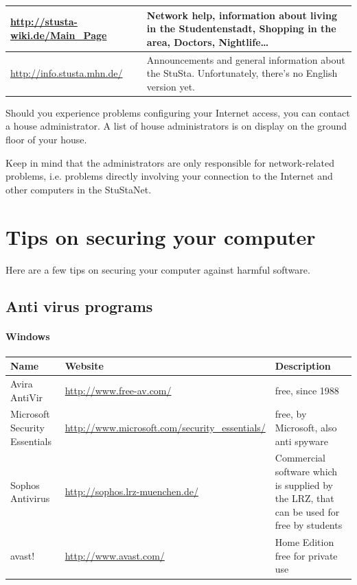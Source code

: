 \documentclass[a4paper,12pt]{scrartcl}
\begin{document}
\begin{center}
  \begin{tabularx}{\linewidth}{|lX|}
    \hline
    \url{http://stusta-wiki.de/Main_Page} & Network help, information about living in the Studentenstadt, Shopping in the area, Doctors, Nightlife\dots\\
    \hline
    \url{http://info.stusta.mhn.de/} & Announcements and general information about the StuSta. Unfortunately, there's no English version yet.\\
    \hline
  \end{tabularx}
\end{center}
Should you experience problems configuring your Internet access, you can contact a house administrator. A list of house administrators is on display on the ground floor of your house.

Keep in mind that the administrators are only responsible for network-related problems, i.e. problems directly involving your connection to the Internet and other computers in the StuStaNet.

\newpage
\section*{Tips on securing your computer}

Here are a few tips on securing your computer against harmful software.

\subsection*{Anti virus programs}
\paragraph*{Windows}
\begin{center}
  \begin{tabularx}{\linewidth}{|p{.2\linewidth}XX|}
    \hline
    Name & Website & Description\\
    \hline \hline
    Avira AntiVir & \url{http://www.free-av.com/} & free, since 1988\\
    \hline
    Microsoft Security Essentials & \url{http://www.microsoft.com/security\_essentials/} & free, by Microsoft, also anti spyware\\
    \hline
    Sophos Antivirus & \url{http://sophos.lrz-muenchen.de/} & Commercial software which is supplied by the LRZ, that can be used for free by students\\
    \hline
    avast! & \url{http://www.avast.com/} & Home Edition free for private use\\
    \hline
  \end{tabularx}
\end{center}
\end{document}
